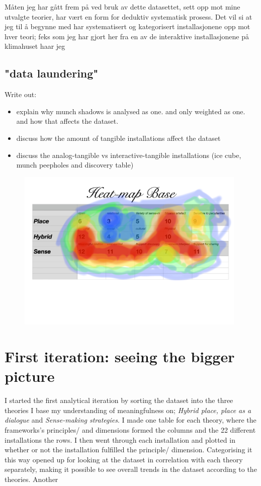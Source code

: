 Måten jeg har gått frem på ved bruk av dette datasettet, sett opp mot mine utvalgte teorier, har vært en form for deduktiv systematisk prosess. Det vil si at jeg til å begynne med har systematisert og kategorisert installasjonene opp mot hver teori; feks som jeg har gjort her fra en av de interaktive installasjonene på klimahuset haar jeg

\subsection{"data laundering"}
Write out:
\begin{itemize}
    \item explain why munch shadows is analysed as one. and only weighted as one. and how that affects the dataset.
    \item discuss how the amount of tangible installations affect the dataset
    \item discuss the analog-tangible vs interactive-tangible installations (ice cube, munch peepholes and discovery table)
\end{itemize}

\begin{figure}[H]
\includegraphics[width=11cm]{pictures/dataset/heatmap.jpg}
\centering 
\end{figure}


\section{First iteration: seeing the bigger picture}

I started the first analytical iteration by sorting the dataset into the three theories I base my understanding of meaningfulness on; \emph{Hybrid place, place as a dialogue} and \emph{Sense-making strategies}. I made one table for each theory, where the frameworks's principles/ and dimensions formed the columns and the 22 different installations the rows. I then went through each installation and plotted in whether or not the installation fulfilled the principle/ dimension. Categorising it this way opened up for looking at the dataset in correlation with each theory separately, making it possible to see overall trends in the dataset according to the theories. Another



